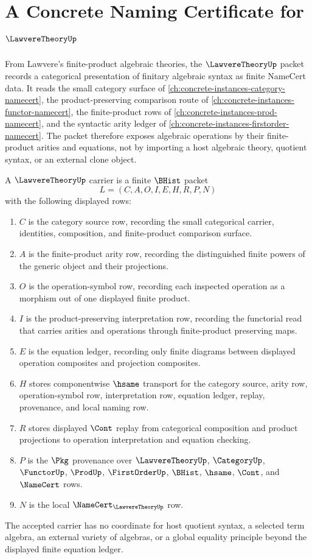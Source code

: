 \chapter{A Concrete Naming Certificate for $\LawvereTheoryUp$}
\label{ch:concrete-instances-lawvere-theory-namecert}

From Lawvere's finite-product algebraic theories, the $\LawvereTheoryUp$ packet records a categorical presentation of finitary algebraic syntax as finite NameCert data. It reads the small category surface of \autoref{ch:concrete-instances-category-namecert}, the product-preserving comparison route of \autoref{ch:concrete-instances-functor-namecert}, the finite-product rows of \autoref{ch:concrete-instances-prod-namecert}, and the syntactic arity ledger of \autoref{ch:concrete-instances-firstorder-namecert}. The packet therefore exposes algebraic operations by their finite-product arities and equations, not by importing a host algebraic theory, quotient syntax, or an external clone object.

\begin{definition}
\label{def:lawvere-theory-carrier}
A $\LawvereTheoryUp$ carrier is a finite $\BHist$ packet
$$
L=(C,A,O,I,E,H,R,P,N)
$$
with the following displayed rows:
\begin{enumerate}
\item $C$ is the category source row, recording the small categorical carrier, identities, composition, and finite-product comparison surface.
\item $A$ is the finite-product arity row, recording the distinguished finite powers of the generic object and their projections.
\item $O$ is the operation-symbol row, recording each inspected operation as a morphism out of one displayed finite product.
\item $I$ is the product-preserving interpretation row, recording the functorial read that carries arities and operations through finite-product preserving maps.
\item $E$ is the equation ledger, recording only finite diagrams between displayed operation composites and projection composites.
\item $H$ stores componentwise $\hsame$ transport for the category source, arity row, operation-symbol row, interpretation row, equation ledger, replay, provenance, and local naming row.
\item $R$ stores displayed $\Cont$ replay from categorical composition and product projections to operation interpretation and equation checking.
\item $P$ is the $\Pkg$ provenance over $\LawvereTheoryUp$, $\CategoryUp$, $\FunctorUp$, $\ProdUp$, $\FirstOrderUp$, $\BHist$, $\hsame$, $\Cont$, and $\NameCert$ rows.
\item $N$ is the local $\NameCert_{\LawvereTheoryUp}$ row.
\end{enumerate}
The accepted carrier has no coordinate for host quotient syntax, a selected term algebra, an external variety of algebras, or a global equality principle beyond the displayed finite equation ledger.
\end{definition}

